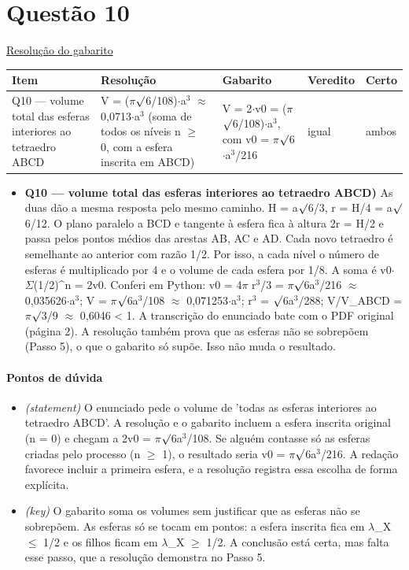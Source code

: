 \documentclass{article}%
\begin{document}
\section*{Questão 10}%
\href{https://poliedroresolve.sistemapoliedro.com.br/vestibulares/ime/2026/ime-2-fase-dia-1-23-10-2025-2-fase-dia-1/dissertativa-10-matematica-2-fase-dia-1-ime-2026}{Resolução do gabarito}\par\smallskip%
\begin{longtable}{@{}p{} p{} p{} p{} p{}@{}}\toprule Item & Resolução & Gabarito & Veredito & Certo \\ \midrule
Q10 --- volume total das esferas interiores ao tetraedro ABCD & V = ($\pi$$\surd$6/108)$\cdot$a$^3$ $\approx$ 0,0713$\cdot$a$^3$ (soma de todos os níveis n $\geq$ 0, com a esfera inscrita em ABCD) & V = 2$\cdot$v0 = ($\pi$$\surd$6/108)$\cdot$a$^3$, com v0 = $\pi$$\surd$6$\cdot$a$^3$/216 & igual & ambos \\
\bottomrule\end{longtable}%
\begin{itemize}%
\item%
\textbf{Q10 --- volume total das esferas interiores ao tetraedro ABCD)} As duas dão a mesma resposta pelo mesmo caminho. H = a$\surd$6/3, r = H/4 = a$\surd$6/12. O plano paralelo a BCD e tangente à esfera fica à altura 2r = H/2 e passa pelos pontos médios das arestas AB, AC e AD. Cada novo tetraedro é semelhante ao anterior com razão 1/2. Por isso, a cada nível o número de esferas é multiplicado por 4 e o volume de cada esfera por 1/8. A soma é v0$\cdot$$\Sigma$(1/2)\^{}n = 2v0. Conferi em Python: v0 = 4$\pi$ r$^3$/3 = $\pi$$\surd$6a$^3$/216 $\approx$ 0,035626$\cdot$a$^3$; V = $\pi$$\surd$6a$^3$/108 $\approx$ 0,071253$\cdot$a$^3$; r$^3$ = $\surd$6a$^3$/288; V/V\_ABCD = $\pi$$\surd$3/9 $\approx$ 0,6046 < 1. A transcrição do enunciado bate com o PDF original (página 2). A resolução também prova que as esferas não se sobrepõem (Passo 5), o que o gabarito só supõe. Isso não muda o resultado.%
\end{itemize}%
\paragraph{Pontos de dúvida}%
\begin{itemize}%
\item%
\textit{(statement)} O enunciado pede o volume de 'todas as esferas interiores ao tetraedro ABCD'. A resolução e o gabarito incluem a esfera inscrita original (n = 0) e chegam a 2v0 = $\pi$$\surd$6a$^3$/108. Se alguém contasse só as esferas criadas pelo processo (n $\geq$ 1), o resultado seria v0 = $\pi$$\surd$6a$^3$/216. A redação favorece incluir a primeira esfera, e a resolução registra essa escolha de forma explícita.%
\item%
\textit{(key)} O gabarito soma os volumes sem justificar que as esferas não se sobrepõem. As esferas só se tocam em pontos: a esfera inscrita fica em $\lambda$\_X $\leq$ 1/2 e os filhos ficam em $\lambda$\_X $\geq$ 1/2. A conclusão está certa, mas falta esse passo, que a resolução demonstra no Passo 5.%
\end{itemize}%
\end{document}
